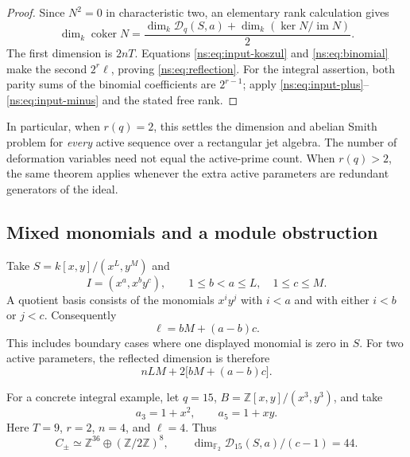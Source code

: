 \begin{proof}
Since $N^2=0$ in characteristic two, an elementary rank calculation gives
\[
 \dim_k\operatorname{coker}N
 =\frac{\dim_k\mathcal D_q(S,a)+
                \dim_k(\ker N/\operatorname{im}N)}2.
\]
The first dimension is $2nT$. Equations \eqref{ns:eq:input-koszul} and
\eqref{ns:eq:binomial} make the second $2^r\ell$, proving
\eqref{ns:eq:reflection}. For the integral assertion, both parity sums of
the binomial coefficients are $2^{r-1}$; apply
\eqref{ns:eq:input-plus}--\eqref{ns:eq:input-minus} and the stated free rank.
\end{proof}

In particular, when $r(q)=2$, this settles the dimension and abelian Smith
problem for \emph{every} active sequence over a rectangular jet algebra.
The number of deformation variables need not equal the active-prime count.
When $r(q)>2$, the same theorem applies whenever the extra active parameters
are redundant generators of the ideal.

\subsection{Mixed monomials and a module obstruction}

Take $S=k[x,y]/(x^L,y^M)$ and
\[
 I=(x^a,x^by^c),\qquad 1\le b<a\le L,\quad1\le c\le M.
\]
A quotient basis consists of the monomials $x^iy^j$ with $i<a$ and with
either $i<b$ or $j<c$. Consequently
\begin{equation}\label{ns:eq:mixed-colength}
 \ell=bM+(a-b)c.
\end{equation}
This includes boundary cases where one displayed monomial is zero in $S$.
For two active parameters, the reflected dimension is therefore
\[
 nLM+2\bigl[bM+(a-b)c\bigr].
\]

For a concrete integral example, let $q=15$,
$B=\mathbb Z[x,y]/(x^3,y^3)$, and take
\[
 a_3=1+x^2,\qquad a_5=1+xy.
\]
Here $T=9$, $r=2$, $n=4$, and $\ell=4$. Thus
\begin{equation}\label{ns:eq:fifteen}
 C_\pm\simeq\mathbb Z^{36}\oplus(\mathbb Z/2\mathbb Z)^8,
 \qquad
 \dim_{\mathbb F_2}\mathcal D_{15}(S,a)/(c-1)=44.
\end{equation}

